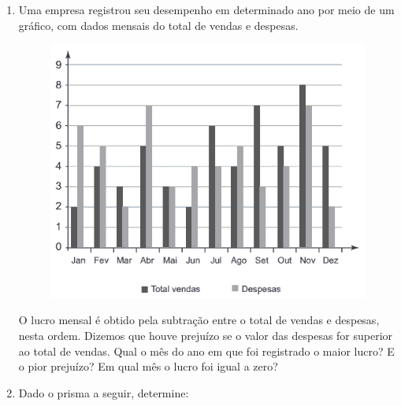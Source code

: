 \documentclass[a4paper, 12pt]{article}
\begin{document}
\begin{enumerate}
	
	\item Uma empresa registrou seu desempenho em determinado ano por meio de um gráfico, com dados mensais do total de vendas e despesas.
		\begin{figure}[!h]
		\centering
		\includegraphics[scale = 0.40]{grafico}
		\end{figure}
			
O lucro mensal é obtido pela subtração entre o total de vendas e despesas, nesta ordem. Dizemos que houve prejuízo se o valor das despesas for superior ao total de vendas. Qual o mês do ano em que foi registrado o maior lucro? E o pior prejuízo? Em qual mês o lucro foi igual a zero?
\vspace{0.7cm}



	\item Dado o prisma a seguir, determine:
		

\end{enumerate}
\end{document}
